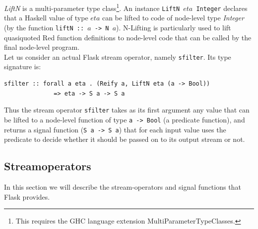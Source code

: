 \documentclass[a4paper, oneside, final]{memoir}
\begin{document}
\textit{LiftN} is a multi-parameter type class\footnote{This requires
  the GHC language extension MultiParameterTypeClasses.}. An instance
\texttt{LiftN $eta$ Integer} declares that a Haskell value of type $eta$
can be lifted to code of node-level type \textit{Integer} (by the
function \texttt{liftN :: $a$ -> N $a$}).  N-Lifting is particularly used to
lift quasiquoted Red function definitions to node-level code that can
be called by the final node-level program.\\

\noindent
Let us consider an actual Flask stream operator, namely
\texttt{sfilter}. Its type signature is:

\begin{verbatim}
sfilter :: forall a eta . (Reify a, LiftN eta (a -> Bool))
              => eta -> S a -> S a
\end{verbatim}

Thus the stream operator \texttt{sfilter} takes as its first argument
any value that can be lifted to a node-level function of type
\texttt{a -> Bool} (a predicate function), and returns a signal
function (\texttt{S a -> S a}) that for each input value uses the
predicate to decide whether it should be passed on to its output
stream or not.


\subsection{Streamoperators}
\label{sec:streamoperators}
In this section we will describe the stream-operators and signal
functions that Flask provides.
\end{document}

